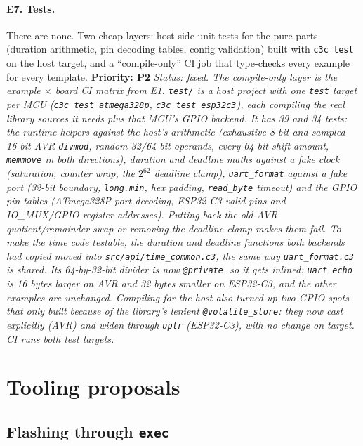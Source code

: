 \documentclass[11pt,a4paper]{article}
\newcommand{\pkg}[1]{\texttt{#1}}
\newcommand{\prio}[1]{\textbf{Priority: #1}}
\begin{document}
\paragraph{E7. Tests.}
There are none. Two cheap layers: host-side unit tests for the pure parts (duration arithmetic,
pin decoding tables, config validation) built with \pkg{c3c test} on the host target, and a
``compile-only'' CI job that type-checks every example for every template. \prio{P2}
\textit{Status: fixed. The compile-only layer is the example $\times$ board CI matrix from E1. \pkg{test/} is a host project with one \pkg{test} target per MCU (\pkg{c3c test atmega328p}, \pkg{c3c test esp32c3}), each compiling the real library sources it needs plus that MCU's GPIO backend. It has 39 and 34 tests: the runtime helpers against the host's arithmetic (exhaustive 8-bit and sampled 16-bit AVR \pkg{divmod}, random 32/64-bit operands, every 64-bit shift amount, \pkg{memmove} in both directions), duration and deadline maths against a fake clock (saturation, counter wrap, the $2^{62}$ deadline clamp), \pkg{uart\_format} against a fake port (32-bit boundary, \pkg{long.min}, hex padding, \pkg{read\_byte} timeout) and the GPIO pin tables (ATmega328P port decoding, ESP32-C3 valid pins and IO\_MUX/GPIO register addresses). Putting back the old AVR quotient/remainder swap or removing the deadline clamp makes them fail. To make the time code testable, the duration and deadline functions both backends had copied moved into \pkg{src/api/time\_common.c3}, the same way \pkg{uart\_format.c3} is shared. Its 64-by-32-bit divider is now \pkg{@private}, so it gets inlined: \pkg{uart\_echo} is 16 bytes larger on AVR and 32 bytes smaller on ESP32-C3, and the other examples are unchanged. Compiling for the host also turned up two GPIO spots that only built because of the library's lenient \pkg{@volatile\_store}: they now cast explicitly (AVR) and widen through \pkg{uptr} (ESP32-C3), with no change on target. CI runs both test targets.}

\section{Tooling proposals}
\label{sec:tooling}

\subsection{Flashing through \pkg{exec}}
\end{document}
